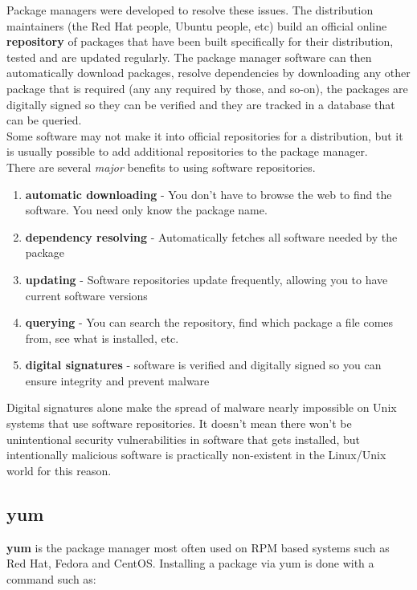 Package managers were developed to resolve these issues.  The distribution maintainers (the Red Hat people, Ubuntu people, etc) build an official online \textbf{repository} of packages that have been built specifically for their distribution, tested and are updated regularly.  The package manager software can then automatically download packages, resolve dependencies by downloading any other package that is required (any any required by those, and so-on), the packages are digitally signed so they can be verified and they are tracked in a database that can be queried.\\

Some software may not make it into official repositories for a distribution, but it is usually possible to add additional repositories to the package manager.\\

There are several \textit{major} benefits to using software repositories.

\begin{enumerate}
\item \textbf{automatic downloading} - You don't have to browse the web to find the software.  You need only know the package name.
\item \textbf{dependency resolving} - Automatically fetches all software needed by the package
\item \textbf{updating} - Software repositories update frequently, allowing you to have current software versions
\item \textbf{querying} - You can search the repository, find which package a file comes from, see what is installed, etc.
\item \textbf{digital signatures} - software is verified and digitally signed so you can ensure integrity and prevent malware
\end{enumerate}

Digital signatures alone make the spread of malware nearly impossible on Unix systems that use software repositories.  It doesn't mean there won't be unintentional security vulnerabilities in software that gets installed, but intentionally malicious software is practically non-existent in the Linux/Unix world for this reason.

\subsection{yum}

\textbf{yum} is the package manager most often used on RPM based systems such as Red Hat, Fedora and CentOS.  Installing a package via yum is done with a command such as:

